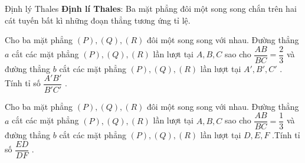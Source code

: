 \begin{dang}{Định lý Thales}
	\textbf{Định lí Thales}: Ba mặt phẳng đôi một song song chắn trên hai cát tuyến bất kì những đoạn thẳng tương ứng tỉ lệ.
\end{dang}
\begin{vd}
	Cho ba mặt phẳng $(P),(Q)  ,(R) $  đôi một song song với nhau. Đường thẳng $a$   cắt các mặt phẳng $(P),(Q)  ,(R) $   lần lượt tại  $A, B, C$ sao cho $\dfrac{AB}{BC}=\dfrac{2}{3}$  và đường thẳng $b$   cắt các mặt phẳng $(P),(Q)  ,(R) $  lần lượt tại $A', B', C'$ . Tính tỉ số $\dfrac{A'B'}{B'C'}$  .
\end{vd}
\begin{vd}
	Cho ba mặt phẳng  $(P),(Q)  ,(R) $  đôi một song song với nhau. Đường thẳng $a$  cắt các mặt phẳng $(P),(Q)  ,(R) $   lần lượt tại   $A, B, C$ sao cho $\dfrac{AB}{BC}=\dfrac{1}{3}$    và đường thẳng $b$  cắt các mặt phẳng   $(P),(Q)  ,(R) $   lần lượt tại $D, E, F$ .Tính tỉ số $\dfrac{ED}{DF}$  .
\end{vd}
